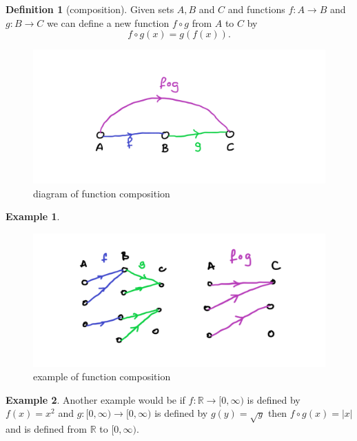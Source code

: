 \documentclass[
]{book}
\theoremstyle{definition}
\newtheorem{definition}{Definition}[chapter]
\theoremstyle{definition}
\newtheorem{example}{Example}[chapter]
\theoremstyle{definition}
\theoremstyle{definition}
\theoremstyle{remark}
\begin{document}
\begin{definition}[composition]

Given sets \(A, B\) and \(C\) and functions \(f: A \rightarrow B\) and \(g: B \rightarrow C\) we can define a new function \(f \circ g\) from \(A\) to \(C\) by
\[ f\circ g(x) = g(f(x)).  \]

\begin{figure}
\centering
\includegraphics{compositiondiagram.png}
\caption{\label{fig:unnamed-chunk-17}diagram of function composition}
\end{figure}

\end{definition}

\begin{example}

\begin{figure}
\centering
\includegraphics{compositionexample.png}
\caption{\label{fig:unnamed-chunk-18}example of function composition}
\end{figure}

\end{example}

\begin{example}
Another example would be if \(f: \mathbb{R} \rightarrow [0,\infty)\) is defined by \(f(x) = x^2\) and \(g: [0,\infty) \rightarrow [0, \infty)\) is defined by \(g(y) = \sqrt{y}\) then \(f \circ g (x) = |x|\) and is defined from \(\mathbb{R}\) to \([0,\infty)\).
\end{example}
\end{document}
